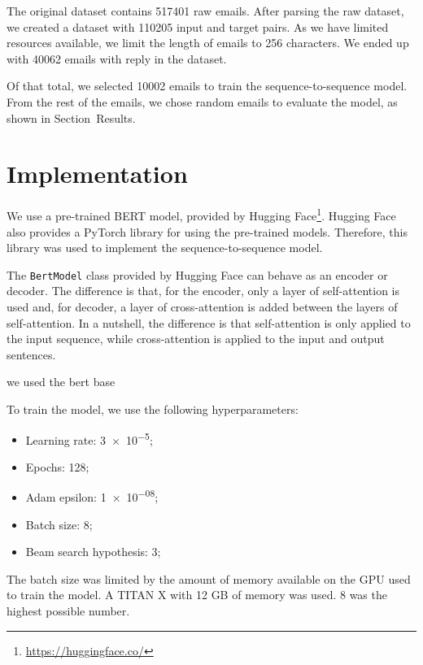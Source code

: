 \documentclass[letterpaper]{article}
\begin{document}
The original dataset contains \num{517401} raw emails. After parsing the raw dataset, we created a dataset with \num{110205} input and target pairs. As we have limited resources available, we limit the length of emails to \num{256} characters. We ended up with \num{40062} emails with reply in the dataset.

Of that total, we selected \num{10002} emails to train the sequence-to-sequence model. From the rest of the emails, we chose random emails to evaluate the model, as shown in Section~Results.


\section{Implementation}

We use a pre-trained BERT model, provided by Hugging Face\footnote{\href{https://huggingface.co/}{https://huggingface.co/}}. Hugging Face also provides a PyTorch library for using the pre-trained models. Therefore, this library was used to implement the sequence-to-sequence model.

The \texttt{BertModel} class provided by Hugging Face can behave as an encoder or decoder. The difference is that, for the encoder, only a layer of self-attention is used and, for decoder, a layer of cross-attention is added between the layers of self-attention. In a nutshell, the difference is that self-attention is only applied to the input sequence, while cross-attention is applied to the input and output sentences.

we used the bert base

To train the model, we use the following hyperparameters:

\begin{itemize}
    \item Learning rate: \num{3e-5};
    \item Epochs: \num{128};
    \item Adam epsilon: \num{1e-08};
    \item Batch size: \num{8};
    \item Beam search hypothesis: \num{3};
\end{itemize}


The batch size was limited by the amount of memory available on the GPU used to train the model. A TITAN X with 12 GB of memory was used. \num{8} was the highest possible number.
\end{document}
